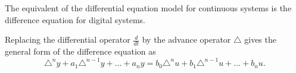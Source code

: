 The equivalent of the differential equation model for continuous
systems is the difference equation for digital systems.

Replacing
the differential operator $\frac{d}{dt}$ by the advance operator
$\triangle$ gives the general form of the difference equation as
\begin{equation}\label{eq:l9e1}
  \triangle^ny + a_{1}\triangle^{n-1}y + \ldots +  a_n y = b_0
  \triangle^n u + b_{1}\triangle^{n-1} u + \ldots + b_n u.
\end{equation}

\endinput

